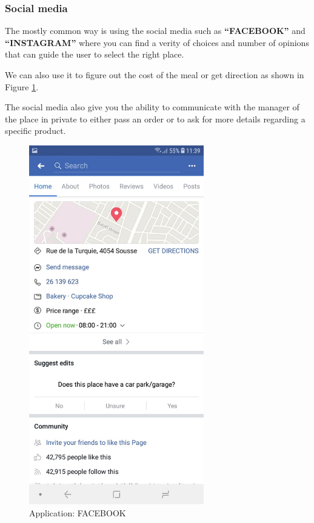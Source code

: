 \documentclass[12pt,a4paper]{report}
\begin{document}
	\subsubsection*{Social media}
	The mostly common way is using the social media such as \textbf{``FACEBOOK''} and \textbf{``INSTAGRAM''} where you can find a verity of choices and number of opinions that can guide the user to select the right place.\par We can also use it to figure out the cost of the meal or get direction as shown in Figure \ref{label-facebook}.
	\par The social media also give you the ability to communicate with the manager of the place in private to either pass an order or to ask for more details regarding a specific product.  \par
	\begin{figure}[H]
		\centering
		\includegraphics[width=3in,keepaspectratio]{facebook.jpg}
		\caption{Application: FACEBOOK\protect{}\protect\footnotemark[\thefootnote]}
		
		\label{label-facebook}
	\end{figure}
	\clearpage
\end{document}
